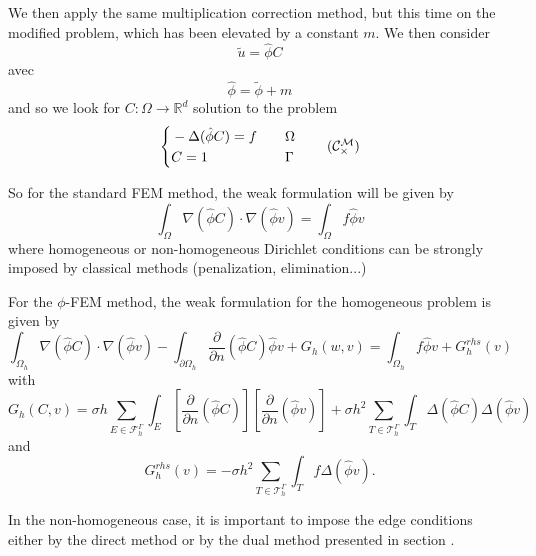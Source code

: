 We then apply the same multiplication correction method, but this time on the modified problem, which has been elevated by a constant $m$. We then consider
\begin{equation*}
	\tilde{u}=\hat{\phi}C
\end{equation*}
avec 
\begin{equation*}
	\hat{\phi}=\tilde{\phi}+m
\end{equation*}
and so we look for $C: \Omega \rightarrow \mathbb{R}^d$ solution to the problem
\begin{equation}
	\label{eq.corr.pbc_mult_reh}
	\left\{\begin{aligned}
		&-\Delta (\hat{\phi}C)=f \quad &&\Omega \\
		&C=1 \quad &&\Gamma
	\end{aligned}\right. \tag{$\mathcal{C}_\times^\mathcal{M}$}
\end{equation}

So for the standard FEM method, the weak formulation will be given by
\begin{equation*}
	\int_\Omega \nabla (\hat{\phi}C)\cdot\nabla (\hat{\phi}v)=\int_\Omega f\hat{\phi}v
\end{equation*}
where homogeneous or non-homogeneous Dirichlet conditions can be strongly imposed by classical methods (penalization, elimination...)

For the $\phi$-FEM method, the weak formulation for the homogeneous problem is given by
\begin{equation*}
	\int_{\Omega_h} \nabla (\hat{\phi} C) \cdot \nabla (\hat{\phi} v) - \int_{\partial\Omega_h} \frac{\partial}{\partial n}(\hat{\phi} C)\hat{\phi} v+G_h(w,v)=\int_{\Omega_h} f \hat{\phi} v + G_h^{rhs}(v)
\end{equation*}
with
\begin{equation*}
	G_h(C,v)=\sigma h\sum_{E\in\mathcal{F}_h^\Gamma} \int_E \left[\frac{\partial}{\partial n}(\hat{\phi} C)\right] \left[\frac{\partial}{\partial n}(\hat{\phi} v)\right]+\sigma h^2\sum_{T\in\mathcal{T}_h^\Gamma} \int_{T} \Delta(\hat{\phi} C)\Delta(\hat{\phi} v)
\end{equation*}
and
\begin{equation*}
	G_h^{rhs}(v)=-\sigma h^2\sum_{T\in\mathcal{T}_h^\Gamma} \int_{T} f \Delta(\hat{\phi} v).
\end{equation*}

In the non-homogeneous case, it is important to impose the edge conditions either by the direct method or by the dual method presented in section . 

